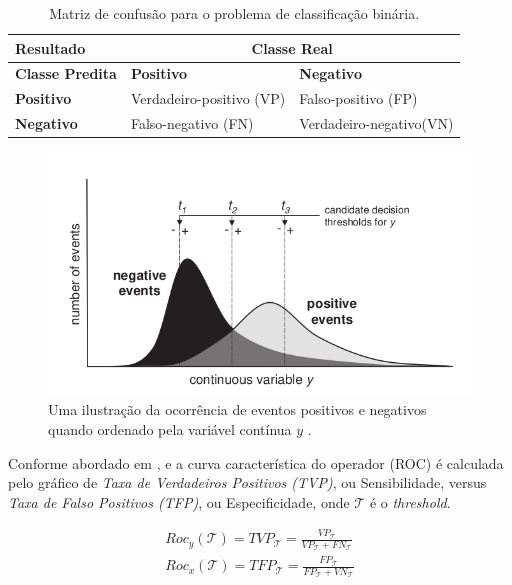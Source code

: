 \begin{table}[htb]
\centering
\caption{Matriz de confusão para o problema de classificação binária.}
\label{tabela:matriz_conf}
\begin{tabular}{|p{3cm}|p{5cm}|p{5cm}|} 
 \hline
\textbf{Resultado} & \multicolumn{2}{c|}{\textbf{Classe Real}} \\
  \hline
  \textbf{Classe Predita} & \textbf{Positivo} & \textbf{Negativo} \\
  \hline
  \textbf{Positivo} & Verdadeiro-positivo (VP) & Falso-positivo (FP) \\
  \hline
  \textbf{Negativo} & Falso-negativo (FN) & Verdadeiro-negativo(VN) \\
  \hline
\end{tabular}
\end{table}

\begin{figure}[htb]
 \caption{Uma ilustração da ocorrência de eventos positivos e negativos
quando ordenado pela variável contínua $y$ \cite{BROWN200624}.}
 \label{fig:roc_brown}
 \centering
 \includegraphics[scale=0.5]{images/roc_threshold.png}
\end{figure}

Conforme abordado em \cite{BROWN200624}, \cite{FAWCETT2006861} e \cite{kuhn} a curva característica do operador (ROC) é calculada pelo gráfico de \textit{Taxa de Verdadeiros Positivos (TVP)}, ou Sensibilidade, versus \textit{Taxa de Falso Positivos (TFP)}, ou Especificidade, onde $\mathcal{T}$ é o \textit{threshold}.

\begin{gather*}
    Roc_{y}(\mathcal{T}) = TVP_{\mathcal{T}} = \frac{VP_{\mathcal{T}}}{VP_{\mathcal{T}} + FN_{\mathcal{T}}} \\
    Roc_{x}(\mathcal{T}) = TFP_{\mathcal{T}} = \frac{FP_{\mathcal{T}}}{FP_{\mathcal{T}} + VN_{\mathcal{T}}}
\end{gather*}

